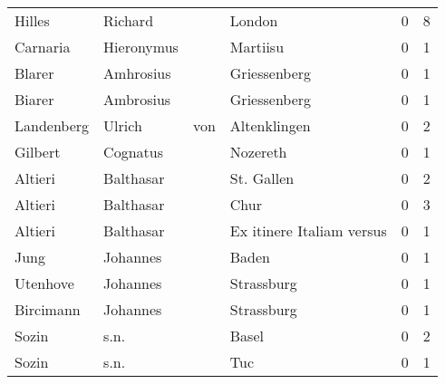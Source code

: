 \begin{tabular}{llllrr}
                   Hilles &                            Richard &             &                                      London &          0 &         8 \\
                 Carnaria &                         Hieronymus &             &                                    Martiisu &          0 &         1 \\
                   Blarer &                          Amhrosius &             &                                Griessenberg &          0 &         1 \\
                   Biarer &                          Ambrosius &             &                                Griessenberg &          0 &         1 \\
               Landenberg &                             Ulrich &         von &                                Altenklingen &          0 &         2 \\
                  Gilbert &                           Cognatus &             &                                    Nozereth &          0 &         1 \\
                  Altieri &                          Balthasar &             &                                  St. Gallen &          0 &         2 \\
                  Altieri &                          Balthasar &             &                                        Chur &          0 &         3 \\
                  Altieri &                          Balthasar &             &                   Ex itinere Italiam versus &          0 &         1 \\
                     Jung &                           Johannes &             &                                       Baden &          0 &         1 \\
                 Utenhove &                           Johannes &             &                                  Strassburg &          0 &         1 \\
                Bircimann &                           Johannes &             &                                  Strassburg &          0 &         1 \\
                    Sozin &                               s.n. &             &                                       Basel &          0 &         2 \\
                    Sozin &                               s.n. &             &                                         Tuc &          0 &         1 \\

\end{tabular}
